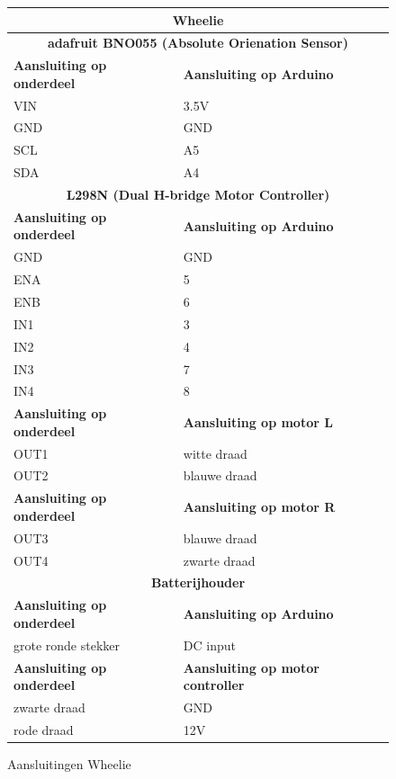 \documentclass[12pt,a4paper]{article}
\begin{document}
\begin{figure} [H]
	\begin{tabularx}{\textwidth}{|X|X|}	
		\hline \multicolumn{2}{|c|}{\textbf{Wheelie}}	\\	
		\hline \multicolumn{2}{|c|}{\textbf{adafruit BNO055 (Absolute Orienation Sensor)}}	\\	
		\hline \textbf{Aansluiting op onderdeel} & \textbf{Aansluiting op Arduino} \\ 
		\hline VIN & 3.5V \\ 
		\hline GND & GND\\ 
		\hline SCL & A5 \\  
		\hline SDA & A4 \\
		\hline \multicolumn{2}{|c|}{\textbf{L298N (Dual H-bridge Motor Controller)}}	\\	 
		\hline \textbf{Aansluiting op onderdeel} & \textbf{Aansluiting op Arduino} \\
		\hline GND & GND \\
		\hline ENA & 5  \\
		\hline ENB & 6 \\
		\hline IN1 & 3 \\
		\hline IN2 & 4 \\
		\hline IN3 & 7 \\
		\hline IN4 & 8 \\
		\hline \textbf{Aansluiting op onderdeel} & \textbf{Aansluiting op motor L} \\
		\hline OUT1 & witte draad \\
		\hline OUT2 & blauwe draad \\
		\hline \textbf{Aansluiting op onderdeel} & \textbf{Aansluiting op motor R} \\
		\hline OUT3 & blauwe draad \\
		\hline OUT4 & zwarte draad \\
		\hline \multicolumn{2}{|c|}{\textbf{Batterijhouder}}\\	 
		\hline \textbf{Aansluiting op onderdeel} & \textbf{Aansluiting op Arduino} \\
		\hline grote ronde stekker & DC input \\
		\hline \textbf{Aansluiting op onderdeel} & \textbf{Aansluiting op motor controller} \\
		\hline zwarte draad & GND \\
		\hline rode draad & 12V \\		
		\hline		
	\end{tabularx} 
	\caption{Aansluitingen Wheelie}
	\label{tbl:Aansluitingen_Wheelie}
\end{figure}
\end{document}
